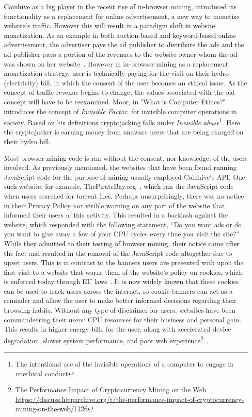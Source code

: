 Coinhive as a big player in the recent rise of in-browser mining, introduced its functionality as a replacement for online advertisement, a new way to monetize website`s traffic. However this will result in a paradigm shift in website monetization. As an example in both auction-based and keyword-based online advertisement, the advertiser pays the ad publisher to distribute the ads and the ad publisher pays a portion of the revenues to the website owner whom the ad was shown on her website~\cite{king2007internet}. However in in-browser mining as a replacement monetization strategy, user is technically paying for the visit on their hydro (electricity) bill, in which the consent of the user becomes an ethical issue. As the concept of traffic revenue begins to change, the values associated with the old concept will have to be reexamined. Moor, in "What is Computer Ethics?" ~\cite{moor1985computer} introduces the concept of \textit{Invisible Factor}, for invisible computer operations in society. Based on his definitions cryptojacking falls under \textit{Invisible abuse}\footnote{The intentional use of the invisible operations of a computer to engage in unethical conduct}. Here the cryptojacker is earning money from unaware users that are being charged on their hydro bill. 

Most browser mining code is ran without the consent, nor knowledge, of the users involved. As previously mentioned, the websites that have been found running JavaScript code for the purpose of mining usually employed Coinhive`s API. One such website, for example, ThePirateBay.org~\cite{bbcmintcrypto}, which ran the JavaScript code when users searched for torrent files. Perhaps unsurprisingly, there was no notice in their Privacy Policy nor visible warning on any part of the website that informed their users of this activity. This resulted in a backlash against the website, which responded with the following statement, ``Do you want ads or do you want to give away a few of your CPU cycles every time you visit the site?'' ~\cite{piratesbayblog}. While they admitted to their testing of browser mining, their notice came after the fact and resulted in the removal of the JavaScript code altogether due to upset users. This is in contrast to the banners users are presented with upon the first visit to a website that warns them of the website`s policy on cookies, which is enforced today through EU laws~\cite{eucookie}. It is now widely known that these cookies can be used to track users across the internet, so cookie banners can act as a reminder and allow the user to make better informed decisions regarding their browsing habits. Without any type of disclaimer for users, websites have been commandeering their users` CPU resources for their business and personal gain. This results in higher energy bills for the user, along with accelerated device degradation, slower system performance, and poor web experience\footnote{The Performance Impact of Cryptocurrency Mining on the Web \url{https://discuss.httparchive.org/t/the-performance-impact-of-cryptocurrency-mining-on-the-web/1126}}~\cite{gaurdianelectricity}.

